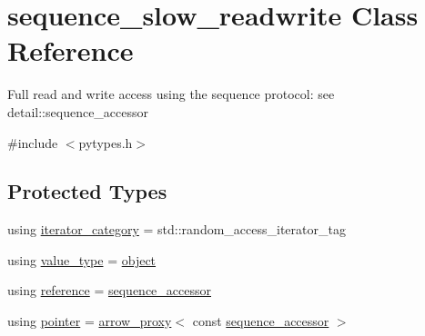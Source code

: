 \hypertarget{classsequence__slow__readwrite}{}\section{sequence\+\_\+slow\+\_\+readwrite Class Reference}
\label{classsequence__slow__readwrite}


Full read and write access using the sequence protocol\+: see {\ttfamily detail\+::sequence\+\_\+accessor}  




{\ttfamily \#include $<$pytypes.\+h$>$}

\subsection*{Protected Types}
\begin{DoxyCompactItemize}
\item 
using \mbox{\hyperlink{classsequence__slow__readwrite_a2697f5faf3ab47b580e49071a9993010}{iterator\+\_\+category}} = std\+::random\+\_\+access\+\_\+iterator\+\_\+tag
\item 
using \mbox{\hyperlink{classsequence__slow__readwrite_a8ce9048b056a9f653715535c60f2d4bf}{value\+\_\+type}} = \mbox{\hyperlink{classobject}{object}}
\item 
using \mbox{\hyperlink{classsequence__slow__readwrite_ad59d36dc33d3bcff00de01c2d21ffe42}{reference}} = \mbox{\hyperlink{pytypes_8h_afb835b9074801782e0f25a6d78d1d450}{sequence\+\_\+accessor}}
\item 
using \mbox{\hyperlink{classsequence__slow__readwrite_a5d342cf04b1e283c0dbb03e741cb3ae8}{pointer}} = \mbox{\hyperlink{structarrow__proxy}{arrow\+\_\+proxy}}$<$ const \mbox{\hyperlink{pytypes_8h_afb835b9074801782e0f25a6d78d1d450}{sequence\+\_\+accessor}} $>$
\end{DoxyCompactItemize}
